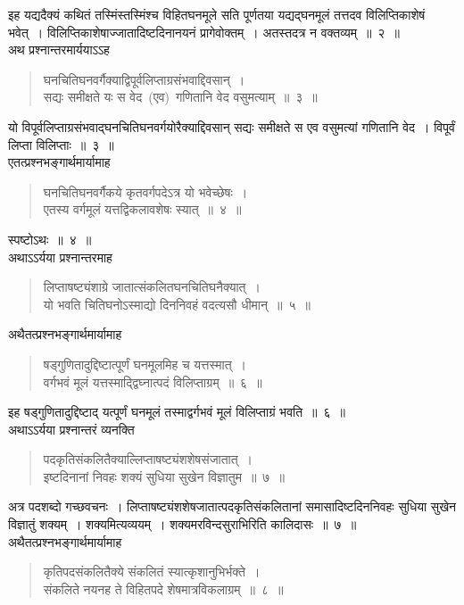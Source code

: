 \documentclass[11pt, openany]{book}
\begin{document}
\newpage
\thispagestyle{fancy}
\fancyhf{}
\indent
इह यद्यदैक्यं कथितं तस्मिंस्तस्मिंश्च विहितघनमूले सति पूर्णतया यद्यद्घनमूलं तत्तदव विलिप्तिकाशेषं भवेत्~। विलिप्तिकाशेषाज्जातादिष्टदिनानयनं प्रागेवोक्तम्~। अतस्तदत्र न वक्तव्यम्~॥~२~॥\\
\indent
अथ प्रश्नान्तरमार्ययाऽऽह\textendash
\begin{quote}
{\ks घनचितिघनवर्गैक्याद्विपूर्वलिप्ताग्रसंभवाद्दिवसान्~।\\
सद्यः समीक्षते यः स वेद~(एव)~गणितानि वेद वसुमत्याम्~॥~३~॥}
\end{quote}

\indent
यो विपूर्वलिप्ताग्रसंभवाद्घनचितिघनवर्गयोरैक्याद्दिवसान् सद्यः समीक्षते स एव वसुमत्यां गणितानि वेद~। विपूर्वं लिप्ता विलिप्ताः~॥~३~॥\\
\indent
एतत्प्रश्नभङ्गार्थमार्यामाह\textendash
\begin{quote}
{\ks घनचितिघनवर्गैकये कृतवर्गपदेऽत्र यो भवेच्छेषः~।\\
एतस्य वर्गमूलं यत्तद्विकलावशेषः स्यात्~॥~४~॥}
\end{quote}

\indent
स्पष्टोऽथः~॥~४~॥\\
\indent
अथाऽऽर्यया प्रश्नान्तरमाह\textendash\

\begin{quote}
{\ks लिप्ताषष्ट्यंशाग्रे जातात्संकलितघनचितिघनैक्यात्~।\\
यो भवति चितिघनोऽस्माद्यो दिननिवहं वदत्यसौ धीमान्~॥~५~॥}
\end{quote}

\indent
अथैतत्प्रश्नभङ्गार्थमार्यामाह\textendash
\begin{quote}
{\ks षड्गुणितादुद्दिष्टात्पूर्णं घनमूलमिह च यत्तस्मात्~।\\
वर्गभवं मूलं यत्तस्माद्द्विघ्नात्पदं विलिप्ताग्रम्~॥~६~॥}
\end{quote}

\indent
इह षड्गुणितादुद्दिष्टाद् यत्पूर्णं घनमूलं तस्माद्वर्गभवं मूलं विलिप्ताग्रं भवति~॥~६~॥\\
\indent
अथाऽऽर्यया प्रश्नान्तरं व्यनक्ति\textendash
\begin{quote}
{\ks पदकृतिसंकलितैक्याल्लिप्ताषष्ट्यंशशेषसंजातात्~।\\
इष्टदिनानां निवहः शक्यं सुधिया सुखेन विज्ञातुम~॥~७~॥}
\end{quote}

\indent
अत्र पदशब्दो गच्छवचनः~। लिप्ताषष्ट्यंशशेषजातात्पदकृतिसंकलितानां समासादिष्टदिननिवहः सुधिया सुखेन विज्ञातुं शक्यम्~। शक्यमित्यव्ययम्~। शक्यमरविन्दसुराभिरिति कालिदासः~॥~७~॥\\
\indent
अथैतत्प्रश्नभङ्गार्थमार्यामाह\textendash
\begin{quote}
{\ks कृतिपदसंकलितैक्ये संकलितं स्यात्कृशानुभिर्भक्ते~।\\
संकलिते नयनह ते विहितपदे शेषमात्रविकलाग्रम्~॥~८~॥}
\end{quote}
\end{document}
